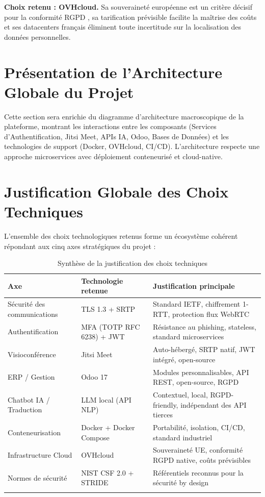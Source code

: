 \textbf{Choix retenu : OVHcloud.} Sa souveraineté européenne est un critère décisif pour la conformité RGPD \cite{rgpd}, sa tarification prévisible facilite la maîtrise des coûts et ses datacenters français éliminent toute incertitude sur la localisation des données personnelles.

\section{Présentation de l'Architecture Globale du Projet}

Cette section sera enrichie du diagramme d'architecture macroscopique de la plateforme, montrant les interactions entre les composants (Services d'Authentification, Jitsi Meet, APIs IA, Odoo, Bases de Données) et les technologies de support (Docker, OVHcloud, CI/CD). L'architecture respecte une approche microservices avec déploiement conteneurisé et cloud-native.

\section*{Justification Globale des Choix Techniques}
L'ensemble des choix technologiques retenus forme un écosystème cohérent répondant aux cinq axes stratégiques du projet :

\begin{longtable}{|m{3.5cm}|m{3.5cm}|m{6cm}|}
\hline
\textbf{Axe} & \textbf{Technologie retenue} & \textbf{Justification principale} \\
\hline
\endhead
\endfoot
\endlastfoot
\hline
Sécurité des communications & TLS 1.3 + SRTP & Standard IETF, chiffrement 1-RTT, protection flux WebRTC \\
\hline
Authentification & MFA (TOTP RFC 6238) + JWT & Résistance au phishing, stateless, standard microservices \\
\hline
Visioconférence & Jitsi Meet & Auto-hébergé, SRTP natif, JWT intégré, open-source \\
\hline
ERP / Gestion & Odoo 17 & Modules personnalisables, API REST, open-source, RGPD \\
\hline
Chatbot IA / Traduction & LLM local (API NLP) & Contextuel, local, RGPD-friendly, indépendant des API tierces \cite{whisper} \\
\hline
Conteneurisation & Docker + Docker Compose & Portabilité, isolation, CI/CD, standard industriel \cite{docker} \\
\hline
Infrastructure Cloud & OVHcloud & Souveraineté UE, conformité RGPD native, coûts prévisibles \\
\hline
Normes de sécurité & NIST CSF 2.0 + STRIDE & Référentiels reconnus pour la sécurité by design \cite{nist}\cite{stride} \\
\hline
\captionsetup{justification=centering,margin=2cm}
\caption{Synthèse de la justification des choix techniques}
\label{tab:justification}
\end{longtable}

